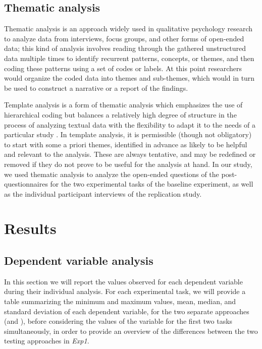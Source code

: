 \subsection{Thematic analysis}
Thematic analysis is an approach widely used in qualitative psychology research to analyze data from interviews, focus groups, and other forms of open-ended data; this kind of analysis involves reading through the gathered unstructured data multiple times to identify recurrent patterns, concepts, or themes, and then coding these patterns using a set of codes or labels. At this point researchers would organize the coded data into themes and sub-themes, which would in turn be used to construct a narrative or a report of the findings.

Template analysis is a form of thematic analysis which emphasizes the use of hierarchical coding but balances a relatively high degree of structure in the process of analyzing textual data with the flexibility to adapt it to the needs of a particular study \cite{ThematicAnalysis}. In template analysis, it is permissible (though not obligatory) to start with some a priori themes, identified in advance as likely to be helpful and relevant to the analysis. These are always tentative, and may be redefined or removed if they do not prove to be useful for the analysis at hand. In our study, we used thematic analysis to analyze the open-ended questions of the post-questionnaires for the two experimental tasks of the baseline experiment, as well as the individual participant interviews of the replication study.



\section{Results}
\subsection{Dependent variable analysis}
In this section we will report the values observed for each dependent variable during their individual analysis. For each experimental task, we will provide a table summarizing the minimum and maximum values, mean, median, and standard deviation of each dependent variable, for the two separate approaches (\ie \tdd and \notdd), before considering the values of the variable for the first two tasks simultaneously, in order to provide an overview of the differences between the two testing approaches in \textit{Exp1}.

